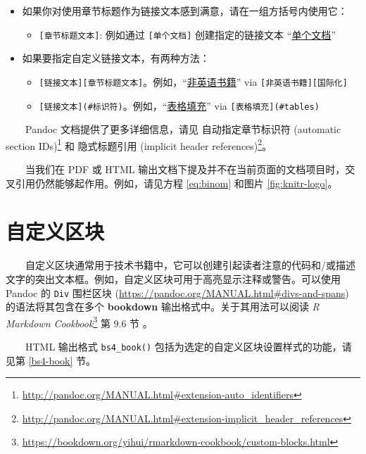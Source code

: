 \documentclass[
  12pt,
]{krantz}
\providecommand{\tightlist}{%
  \setlength{\itemsep}{0pt}\setlength{\parskip}{0pt}}
\renewcommand{\href}[2]{#2\footnote{\url{#1}}}
\theoremstyle{definition}
\theoremstyle{definition}
\theoremstyle{definition}
\theoremstyle{definition}
\theoremstyle{remark}
\begin{document}
\begin{itemize}
\tightlist
\item
  如果你对使用章节标题作为链接文本感到满意，请在一组方括号内使用它：

  \begin{itemize}
  \tightlist
  \item
    \texttt{{[}章节标题文本{]}}: 例如通过 \texttt{{[}单个文档{]}} 创建指定的链接文本 ``\protect\hyperlink{a-single-document}{单个文档}''
  \end{itemize}
\item
  如果要指定自定义链接文本，有两种方法：

  \begin{itemize}
  \tightlist
  \item
    \texttt{{[}链接文本{]}{[}章节标题文本{]}}。例如，``\protect\hyperlink{internationalization}{非英语书籍}'' via \texttt{{[}非英语书籍{]}{[}国际化{]}}
  \item
    \texttt{{[}链接文本{]}(\#标识符)}。例如，``\protect\hyperlink{tables}{表格填充}'' via \texttt{{[}表格填充{]}(\#tables)}
  \end{itemize}
\end{itemize}

  Pandoc 文档提供了更多详细信息，请见 \href{http://pandoc.org/MANUAL.html\#extension-auto_identifiers}{自动指定章节标识符 (automatic section IDs)} 和 \href{http://pandoc.org/MANUAL.html\#extension-implicit_header_references}{隐式标题引用 (implicit header references)}。

  当我们在 PDF 或 HTML 输出文档下提及并不在当前页面的文档项目时，交叉引用仍然能够起作用。例如，请见方程 \eqref{eq:binom} 和图片 \ref{fig:knitr-logo}。

\hypertarget{ux81eaux5b9aux4e49ux533aux5757}{%
\section{自定义区块}\label{ux81eaux5b9aux4e49ux533aux5757}}

  自定义区块通常用于技术书籍中，它可以创建引起读者注意的代码和/或描述文字的突出文本框。例如，自定义区块可用于高亮显示注释或警告。可以使用 Pandoc 的 \texttt{Div} 围栏区块 (\url{https://pandoc.org/MANUAL.html\#divs-and-spans}) 的语法将其包含在多个 \textbf{bookdown} 输出格式中。关于其用法可以阅读 \href{https://bookdown.org/yihui/rmarkdown-cookbook/custom-blocks.html}{\emph{R Markdown Cookbook}} 第 9.6 节 \citep{rmarkdown2020}。

  HTML 输出格式 \texttt{bs4\_book()} 包括为选定的自定义区块设置样式的功能，请见第 \ref{bs4-book} 节。
\end{document}
